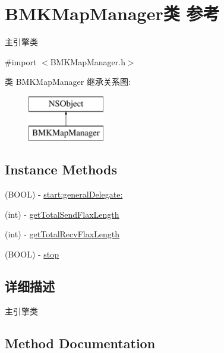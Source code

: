 \hypertarget{interface_b_m_k_map_manager}{}\section{B\+M\+K\+Map\+Manager类 参考}
\label{interface_b_m_k_map_manager}


主引擎类  




{\ttfamily \#import $<$B\+M\+K\+Map\+Manager.\+h$>$}

类 B\+M\+K\+Map\+Manager 继承关系图\+:\begin{figure}[H]
\begin{center}
\leavevmode
\includegraphics[height=2.000000cm]{interface_b_m_k_map_manager}
\end{center}
\end{figure}
\subsection*{Instance Methods}
\begin{DoxyCompactItemize}
\item 
(B\+O\+O\+L) -\/ \hyperlink{interface_b_m_k_map_manager_a95edf9c8fea4c61a79098641c4e9a50f}{start\+:general\+Delegate\+:}
\item 
(int) -\/ \hyperlink{interface_b_m_k_map_manager_a32730c8339c99d79243e13ba2acee3c3}{get\+Total\+Send\+Flax\+Length}
\item 
(int) -\/ \hyperlink{interface_b_m_k_map_manager_a57fcea9612cd09bf8b94bb9e06c7332e}{get\+Total\+Recv\+Flax\+Length}
\item 
(B\+O\+O\+L) -\/ \hyperlink{interface_b_m_k_map_manager_ac53850202f5017ff35c8933c171be0f1}{stop}
\end{DoxyCompactItemize}


\subsection{详细描述}
主引擎类 

\subsection{Method Documentation}
\hypertarget{interface_b_m_k_map_manager_a57fcea9612cd09bf8b94bb9e06c7332e}{}
